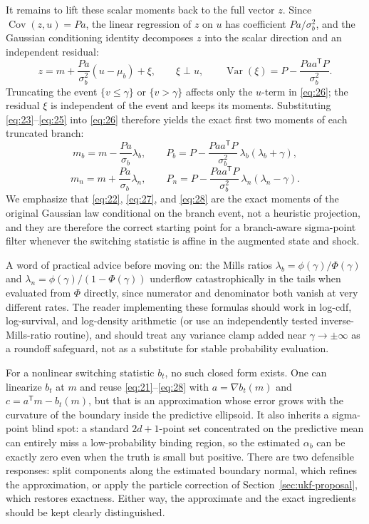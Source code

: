 \documentclass[11pt]{article}
\begin{document}
It remains to lift these scalar moments back to the full vector $z$. Since
$\operatorname{Cov}(z,u)=Pa$, the linear regression of $z$ on $u$ has
coefficient $Pa/\sigma_b^2$, and the Gaussian conditioning identity
decomposes $z$ into the scalar direction and an independent residual:
\begin{equation}\label{eq:26}
 z=m+\frac{Pa}{\sigma_b^2}(u-\mu_b)+\xi,
 \qquad
 \xi\perp u,
 \qquad
 \operatorname{Var}(\xi)=P-\frac{Paa^{\mathsf T}P}{\sigma_b^2}.
\end{equation}
Truncating the event $\{v\leq\gamma\}$ or $\{v>\gamma\}$ affects only the
$u$-term in \eqref{eq:26}; the residual $\xi$ is independent of the event and
keeps its moments. Substituting \eqref{eq:23}--\eqref{eq:25} into
\eqref{eq:26} therefore yields the exact first two moments of each truncated
branch:
\begin{equation}\label{eq:27}
 m_b=m-\frac{Pa}{\sigma_b}\lambda_b,
 \qquad
 P_b=P-\frac{Paa^{\mathsf T}P}{\sigma_b^2}\,
             \lambda_b(\lambda_b+\gamma),
\end{equation}
\begin{equation}\label{eq:28}
 m_n=m+\frac{Pa}{\sigma_b}\lambda_n,
 \qquad
 P_n=P-\frac{Paa^{\mathsf T}P}{\sigma_b^2}\,
             \lambda_n(\lambda_n-\gamma).
\end{equation}
We emphasize that \eqref{eq:22}, \eqref{eq:27}, and \eqref{eq:28} are the
exact moments of the original Gaussian law conditional on the branch event,
not a heuristic projection, and they are therefore the correct starting
point for a branch-aware sigma-point filter whenever the switching statistic
is affine in the augmented state and shock.

A word of practical advice before moving on: the Mills ratios
$\lambda_b=\phi(\gamma)/\Phi(\gamma)$ and
$\lambda_n=\phi(\gamma)/(1-\Phi(\gamma))$ underflow catastrophically in the
tails when evaluated from $\Phi$ directly, since numerator and denominator
both vanish at very different rates. The reader implementing these formulas
should work in log-cdf, log-survival, and log-density arithmetic (or use an
independently tested inverse-Mills-ratio routine), and should treat any
variance clamp added near $\gamma\to\pm\infty$ as a roundoff safeguard, not
as a substitute for stable probability evaluation.

For a nonlinear switching statistic $b_t$, no such closed form exists. One
can linearize $b_t$ at $m$ and reuse \eqref{eq:21}--\eqref{eq:28} with
$a=\nabla b_t(m)$ and $c=a^{\mathsf T}m-b_t(m)$, but that is an approximation
whose error grows with the curvature of the boundary inside the predictive
ellipsoid. It also inherits a sigma-point blind spot: a standard
$2d+1$-point set concentrated on the predictive mean can entirely miss a
low-probability binding region, so the estimated $\alpha_b$ can be exactly
zero even when the truth is small but positive. There are two defensible
responses: split components along the estimated boundary normal, which
refines the approximation, or apply the particle correction of
Section~\ref{sec:ukf-proposal}, which restores exactness. Either way, the
approximate and the exact ingredients should be kept clearly distinguished.
\end{document}
